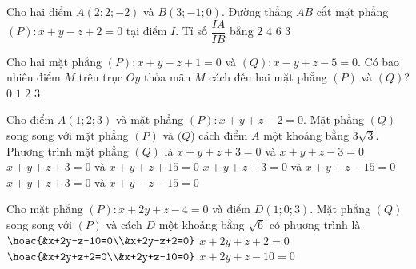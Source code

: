 \begin{ex}
	Cho hai điểm $A(2;2;-2)$ và $B(3;-1;0)$. Đường thẳng $AB$ cắt mặt phẳng $(P)\colon x+y-z+2=0$ tại điểm $I$. Tỉ số $\dfrac{IA}{IB}$ bằng
	\choice
	{\True $2$}
	{$4$}
	{$6$}
	{$3$}
\end{ex}

\begin{ex}%
	Cho hai mặt phẳng $(P) \colon x+y-z+1=0$ và $(Q) \colon x-y+z-5=0.$ Có bao nhiêu điểm $M$ trên trục $Oy$ thỏa mãn $M$ cách đều hai mặt phẳng $(P)$ và $(Q)$?
	\choice
	{$0$}
	{\True $1$}
	{$2$}
	{$3$}
\end{ex}

\begin{ex}%
	Cho điểm $A(1;2;3)$ và mặt phẳng $(P)\colon x+y+z-2=0$. Mặt phẳng $(Q)$ song song với mặt phẳng $(P)$ và $(Q$) cách điểm $A$ một khoảng bằng $3\sqrt{3}$. Phương trình mặt phẳng $(Q)$ là
	\choice
	{$x+y+z+3=0$ và $x+y+z-3=0$}
	{$x+y+z+3=0$ và $x+y+z+15=0$}
	{\True $x+y+z+3=0$ và $x+y+z-15=0$}
	{$x+y+z+3=0$ và $x+y-z-15=0$}
\end{ex}

\begin{ex}
	Cho mặt phẳng $ (P)\colon x+2y+z-4=0 $ và điểm $ D(1;0;3) $. Mặt phẳng $ (Q) $ song song với $ (P) $ và cách $ D $ một khoảng bằng $ \sqrt{6} $ có phương trình là
	\choice
	{$ \hoac{&x+2y-z-10=0\\&x+2y-z+2=0} $}
	{$ x+2y+z+2=0 $}
	{\True $ \hoac{&x+2y+z+2=0\\&x+2y+z-10=0} $}
	{$ x+2y+z-10=0 $}
\end{ex}

